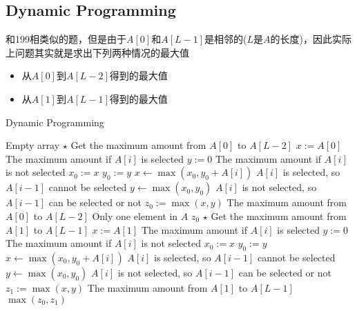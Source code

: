 \subsection{Dynamic Programming}
\begin{CJK*}{UTF8}{gbsn}
和199相类似的题，但是由于$A[0]$和$A[L-1]$是相邻的($L$是$A$的长度)，因此实际上问题其实就是求出下列两种情况的最大值
\begin{itemize}
\item 从$A[0]$到$A[L-2]$得到的最大值
\item 从$A[1]$到$A[L-1]$得到的最大值
\end{itemize}
\end{CJK*}
\setcounter{algorithm}{0}
\begin{algorithm}[H]
\caption{Dynamic Programming}
\begin{algorithmic}[1]
 \Comment Empty array
\State {}
\EndIf
\State $\star$ Get the maximum amount from $A[0]$ to $A[L-2]$
\State $x:=A[0]$ \Comment The maximum amount if $A[i]$ is selected
\State $y:=0$ \Comment The maximum amount if $A[i]$ is not selected
\State $x_0:=x$
\State $y_0:=y$
\State $x\gets \max(x_0, y_0+A[i])$ \Comment $A[i]$ is selected, so $A[i-1]$ cannot be selected
\State $y\gets \max(x_0, y_0)$ \Comment $A[i]$ is not selected, so $A[i-1]$ can be selected or not
\EndFor
\State $z_0:=\max(x,y)$ \Comment The maximum amount from $A[0]$ to $A[L-2]$
 \Comment Only one element in $A$
\State \Return $z_0$
\EndIf
\State $\star$ Get the maximum amount from $A[1]$ to $A[L-1]$
\State $x:=A[1]$ \Comment The maximum amount if $A[i]$ is selected
\State $y:=0$ \Comment The maximum amount if $A[i]$ is not selected
\State $x_0:=x$
\State $y_0:=y$
\State $x\gets \max(x_0, y_0+A[i])$ \Comment $A[i]$ is selected, so $A[i-1]$ cannot be selected
\State $y\gets \max(x_0, y_0)$ \Comment $A[i]$ is not selected, so $A[i-1]$ can be selected or not
\EndFor
\State $z_1:=\max(x,y)$ \Comment The maximum amount from $A[1]$ to $A[L-1]$
\State \Return $\max(z_0, z_1)$
\EndProcedure
\end{algorithmic}
\end{algorithm}
\setcounter{lstlisting}{0}
